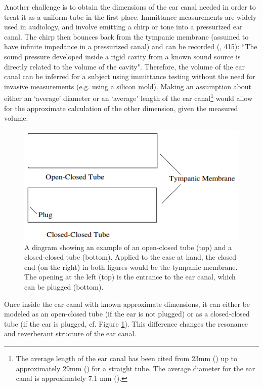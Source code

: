 \documentclass[dissertation,copyright]{uathesis}
\begin{document}
Another challenge is to obtain the dimensions of the ear canal needed in order to treat it as a uniform tube in the first place. Immittance measurements are widely used in audiology, and involve emitting a chirp or tone into a pressurized ear canal.  The chirp then bounces back from the tympanic membrane (assumed to have infinite impedance in a pressurized canal) and can be recorded (\cite{ballachanda:97}, 415): ``The sound pressure developed inside a rigid cavity from a known sound source is directly related to the volume of the cavity".  Therefore, the volume of the ear canal can be inferred for a subject using immittance testing without the need for invasive measurements (e.g. using a silicon mold).  Making an assumption about either an `average' diameter or an `average' length of the ear canal\footnote{The average length of the ear canal has been cited from 23mm (\cite{rosen:91}) up to approximately 29mm (\cite{stinson:89}) for a straight tube. The average diameter for the ear canal is approximately 7.1 mm (\cite{salvinelli:91}).}  would allow for the approximate calculation of the other dimension, given the measured volume. 

\begin{figure}[h]
\centering
  \includegraphics{figure/open-closed-tube.png}
  \caption{A diagram showing an example of an open-closed tube (top) and a closed-closed tube (bottom).  Applied to the case at hand, the closed end (on the right) in both figures would be the tympanic membrane.  The opening at the left (top) is the entrance to the ear canal, which can be plugged (bottom).}
  \label{fig:open-closed-tube}
\end{figure}

Once inside the ear canal with known approximate dimensions, it can either be modeled as an open-closed tube (if the ear is not plugged) or as a closed-closed tube (if the ear is plugged, cf. Figure \ref{fig:open-closed-tube}). This difference changes the resonance and reverberant structure of the ear canal.
\end{document}
